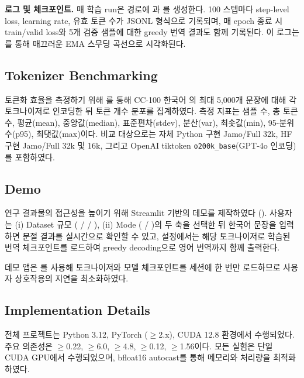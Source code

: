 \documentclass[sigconf,nonacm]{acmart}
\begin{document}
\textbf{로그 및 체크포인트.} 매 학습 run은  경로에
과 를 생성한다. 100 스텝마다 step-level loss, learning rate,
유효 토큰 수가 JSONL 형식으로 기록되며, 매 epoch 종료 시 train/valid loss와 5개 검증 샘플에 대한
greedy 번역 결과도 함께 기록된다. 이 로그는 를 통해 매끄러운 EMA
스무딩 곡선으로 시각화된다.

\subsection{Tokenizer Benchmarking}

토큰화 효율을 측정하기 위해 를 통해 CC-100 한국어
의 최대 5,000개 문장에 대해 각 토크나이저로 인코딩한 뒤 토큰 개수 분포를
집계하였다. 측정 지표는 샘플 수, 총 토큰 수, 평균(mean), 중앙값(median), 표준편차(stdev),
분산(var), 최솟값(min), 95-분위수(p95), 최댓값(max)이다. 비교 대상으로는 자체 Python 구현
Jamo/Full 32k, HF 구현 Jamo/Full 32k 및 16k, 그리고 OpenAI tiktoken \texttt{o200k\_base}(GPT-4o 인코딩)를
포함하였다.

\subsection{Demo}

연구 결과물의 접근성을 높이기 위해 Streamlit 기반의 데모를 제작하였다
(). 사용자는 (i) Dataset 규모 ( /  / ),
(ii) Mode ( / )의 두 축을 선택한 뒤 한국어 문장을 입력하면
분절 결과를 실시간으로 확인할 수 있고,  설정에서는 해당 토크나이저로 학습된
번역 체크포인트를 로드하여 greedy decoding으로 영어 번역까지 함께 출력한다.

데모 앱은 를 사용해 토크나이저와 모델 체크포인트를 세션에 한 번만 로드하므로
사용자 상호작용의 지연을 최소화하였다.

\subsection{Implementation Details}

전체 프로젝트는 Python 3.12, PyTorch ($\ge$2.x), CUDA 12.8 환경에서 수행되었다.
주요 의존성은  $\ge$0.22,  $\ge$6.0,  $\ge$4.8,
 $\ge$0.12,  $\ge$1.56이다. 모든 실험은 단일 CUDA GPU에서
수행되었으며, bfloat16 autocast를 통해 메모리와 처리량을 최적화하였다.
\end{document}

